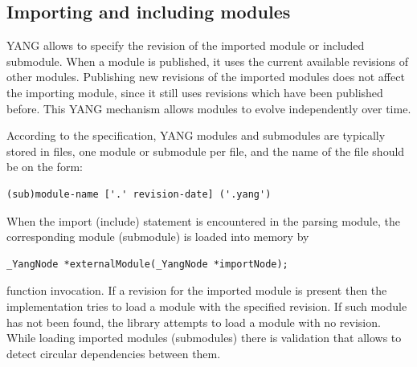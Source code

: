\documentclass[conference]{IEEEtran}
\begin{document}
\subsection{Importing and including modules}
YANG allows to specify the revision of the imported module or included submodule. When a module is published, it uses the current available revisions of other modules. Publishing new revisions of the imported modules  does not affect the importing module, since it still uses revisions which have been published before. This YANG mechanism allows modules to evolve independently over time. 

According to the specification, YANG modules and submodules are typically stored in files, one module or submodule per file, and the name of the file should be on the form:
\small
\begin{verbatim}
(sub)module-name ['.' revision-date] ('.yang')
\end{verbatim}
\normalsize

When the import (include) statement is encountered in the parsing module, the corresponding module (submodule) is loaded into memory by 
\small
\begin{verbatim}
_YangNode *externalModule(_YangNode *importNode);
\end{verbatim}
\normalsize
function invocation. If a revision for the imported module is present then the implementation tries to load a module with the specified revision. 
If such module has not been found, the library attempts to load a module with no revision.
While loading imported modules (submodules) there is validation that allows to detect circular dependencies between them.
\end{document}
